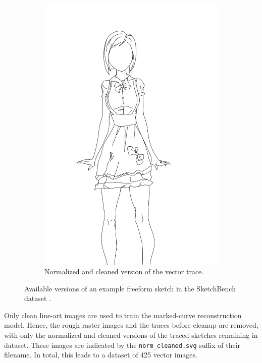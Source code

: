 \begin{figure}[h]
\begin{subfigure}{.3\textwidth}
        \includegraphics[width=\textwidth]{graphics/sketchbench/Art_freeform_AG_03_Branislav Mirkovic_norm_cleaned.pdf}
        \caption{Normalized and cleaned version of the vector trace.}
    \end{subfigure}
    \caption{Available versions of an example freeform sketch in the SketchBench dataset \citep{Yan:2020:ABR}.}
    \label{fig:sketchbench.example}
\end{figure}

Only clean line-art images are used to train the marked-curve reconstruction model. Hence, the rough raster images and the traces before cleanup are removed, with only the normalized and cleaned versions of the traced sketches remaining in dataset. These images are indicated by the \texttt{norm\_cleaned.svg} suffix of their filename. In total, this leads to a dataset of 425 vector images.

